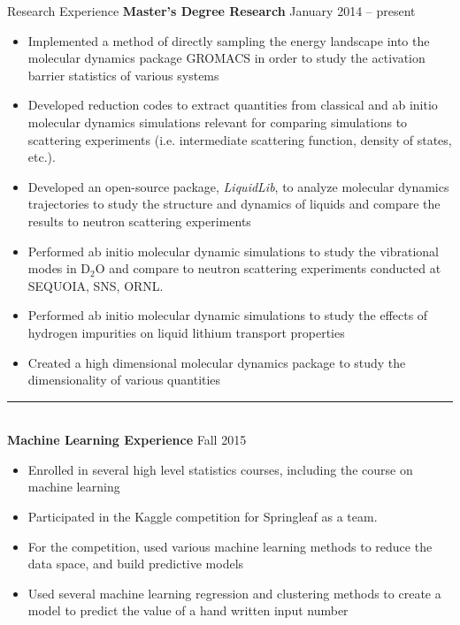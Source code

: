 \documentclass[10pt]{resume} %
\begin{document}


\begin{rSection}{Research Experience}
	{\bf Master's Degree Research} \hfill {January 2014 -- present}
	\begin{itemize}
	\item Implemented a method of directly sampling the energy landscape into the molecular dynamics package GROMACS in order to study the activation barrier statistics of various systems
	\item Developed reduction codes to extract quantities from classical and ab initio molecular dynamics simulations relevant for comparing simulations to scattering experiments (i.e. intermediate scattering function, density of states, etc.).
	\item Developed an open-source package, \textit{LiquidLib}, to analyze molecular dynamics trajectories to study the structure and dynamics of liquids and compare the results to neutron scattering experiments 
	\item Performed ab initio molecular dynamic simulations to study the vibrational modes in D$_2$O and compare to neutron scattering experiments conducted at SEQUOIA, SNS, ORNL. 
	\item Performed ab initio molecular dynamic simulations to study the effects of hydrogen impurities on liquid lithium transport properties
	\item Created a high dimensional molecular dynamics package to study the dimensionality of various quantities
	\end{itemize}
	{\centering\noindent\rule{5cm}{0.4pt}}
	\\
	{\bf Machine Learning Experience} \hfill {Fall 2015}
	\begin{itemize}
		\item Enrolled in several high level statistics courses, including the course on machine learning
		\item Participated in the Kaggle competition for Springleaf as a team. 
		\item For the competition, used various machine learning methods to reduce the data space, and build predictive models
		\item Used several machine learning regression and clustering methods to create a model to predict the value of a hand written input number

\end{itemize}
\end{rSection}
\end{document}
